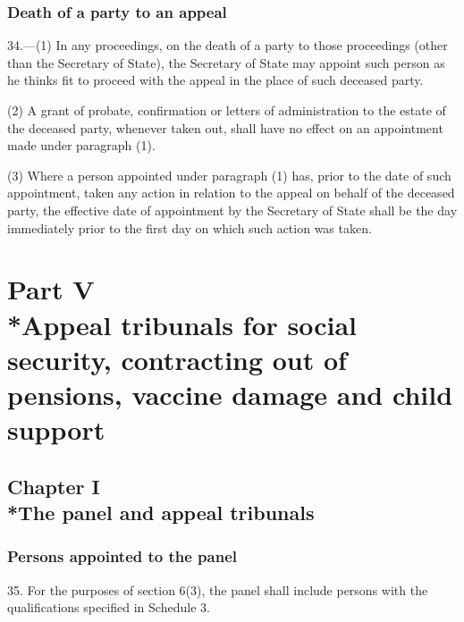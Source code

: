 \documentclass[12pt,a4paper]{article}
\begin{document}

\subsubsection[34. Death of a party to an appeal]{Death of a party to an appeal}

34.—(1) In any proceedings, on the death of a party to those proceedings (other than the Secretary of State), the Secretary of State may appoint such person as he thinks fit to proceed with the appeal in the place of such deceased party.

(2) A grant of probate, confirmation or letters of administration to the estate of the deceased party, whenever taken out, shall have no effect on an appointment made under paragraph (1).

(3) Where a person appointed under paragraph (1) has, prior to the date of such appointment, taken any action in relation to the appeal on behalf of the deceased party, the effective date of appointment by the Secretary of State shall be the day immediately prior to the first day on which such action was taken.

\section[Part V --- Appeal tribunals for social security, contracting out of pensions, vaccine damage and child support]{Part V\\*Appeal tribunals for social security, contracting out of pensions, vaccine damage and child support}

\subsection[Chapter I --- The panel and appeal tribunals]{Chapter I\\*The panel and appeal tribunals}

\subsubsection[35. Persons appointed to the panel]{Persons appointed to the panel}

\renewcommand\parthead{--- Part V Chapter I}

35.  For the purposes of section 6(3), the panel shall include persons with the qualifications specified in Schedule 3.
\end{document}
